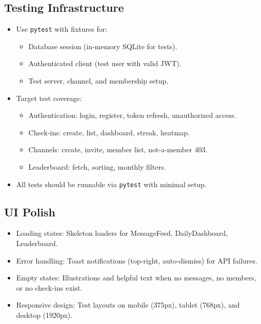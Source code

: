 \documentclass[11pt]{article}
\begin{document}
\subsection{Testing Infrastructure}

\begin{itemize}[leftmargin=1.5em]
    \item Use \texttt{pytest} with fixtures for:
    \begin{itemize}
        \item Database session (in-memory SQLite for tests).
        \item Authenticated client (test user with valid JWT).
        \item Test server, channel, and membership setup.
    \end{itemize}
    \item Target test coverage:
    \begin{itemize}
        \item Authentication: login, register, token refresh, unauthorized access.
        \item Check-ins: create, list, dashboard, streak, heatmap.
        \item Channels: create, invite, member list, not-a-member 403.
        \item Leaderboard: fetch, sorting, monthly filters.
    \end{itemize}
    \item All tests should be runnable via \texttt{pytest} with minimal setup.
\end{itemize}

\subsection{UI Polish}

\begin{itemize}[leftmargin=1.5em]
    \item Loading states: Skeleton loaders for MessageFeed, DailyDashboard, Leaderboard.
    \item Error handling: Toast notifications (top-right, auto-dismiss) for API failures.
    \item Empty states: Illustrations and helpful text when no messages, no members, or no check-ins exist.
    \item Responsive design: Test layouts on mobile (375px), tablet (768px), and desktop (1920px).
\end{itemize}
\end{document}
